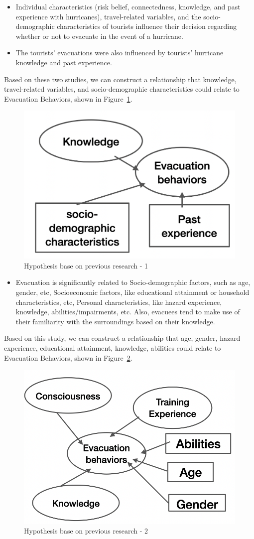 \begin{itemize}
\item Individual characteristics (risk belief, connectedness, knowledge, and past experience with hurricanes), travel-related variables, and the socio-demographic characteristics of tourists influence their decision regarding whether or not to evacuate in the event of a hurricane.~\cite{Cahyanto2014AnEE}
\item The tourists' evacuations were also influenced by tourists' hurricane knowledge and past experience.~\cite{Cahyanto2016StatedPO}
\end{itemize}

Based on these two studies, we can construct a relationship that knowledge, travel-related variables, and socio-demographic characteristics could relate to Evacuation Behaviors, shown in Figure~\ref{fig7}.

\begin{figure}[h]
  \includegraphics[width=0.5\linewidth]{Figure/Figure7.png}
  \centering
  \caption{Hypothesis base on previous research - 1 }
  \label{fig7}
\end{figure}

\begin{itemize}
\item Evacuation is significantly related to Socio-demographic factors, such as age, gender, etc, Socioeconomic factors, like educational attainment or household characteristics, etc, Personal characteristics, like hazard experience, knowledge, abilities/impairments, etc. Also, evacuees tend to make use of their familiarity with the surroundings based on their knowledge.~\cite{Wang2021IncorporatingHF}
\end{itemize}

Based on this study, we can construct a relationship that age, gender, hazard experience,  educational attainment, knowledge, abilities could relate to Evacuation Behaviors, shown in Figure~\ref{fig8}. 

\begin{figure}[h]
  \includegraphics[width=0.5\linewidth]{Figure/Figure8.png}
  \centering
  \caption{Hypothesis base on previous research - 2 }
  \label{fig8}
\end{figure}

